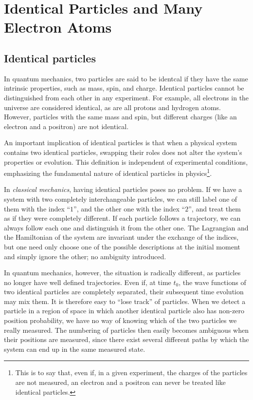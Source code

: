 \section{Identical Particles and Many Electron Atoms}

\subsection{Identical particles}

In quantum mechanics, two particles are said to be identcal if they have the same intrinsic properties, such as mass, spin, and charge. Identical particles cannot be distinguished from each other in any experiment. For example, all electrons in the universe are considered identical, as are all protons and hydrogen atoms. However, particles with the same mass and spin, but different charges (like an electron and a positron) are not identical.

An important implication of identical particles is that when a physical system contains two identical particles, swapping their roles does not alter the system's properties or evolution. This definition is independent of experimental conditions, emphasizing the fundamental nature of identical particles in physics\footnote{This is to say that, even if, in a given experiment, the charges of the particles are not measured, an electron and a positron can never be treated like identical particles.}.

In \textit{classical mechanics}, having identical particles poses no problem. If we have a system with two completely interchangeable particles, we can still label one of them with the index ``$1$'', and the other one with the index ``$2$'', and treat them as if they were completely different. If each particle follows a trajectory, we can always follow each one and distinguish it from the other one. The Lagrangian and the Hamiltonian of the system are invariant under the exchange of the indices, but one need only choose one of the possible descriptions at the initial moment and simply ignore the other; no ambiguity introduced.

In quantum mechanics, however, the situation is radically different, as particles no longer have well defined trajectories. Even if, at time $t_0$, the wave functions of two identical particles are completely separated, their subsequent time evolution may mix them. It is therefore easy to ``lose track'' of particles. When we detect a particle in a region of space in which another identical particle also has non-zero position probability, we have no way of knowing which of the two particles we really measured. The numbering of particles then easily becomes ambiguous when their positions are measured, since there exist several different paths by which the system can end up in the same measured state. 

